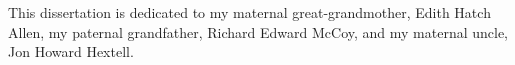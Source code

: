 This dissertation is dedicated to my maternal great-grandmother, Edith Hatch Allen, my paternal grandfather, Richard Edward McCoy, and my maternal uncle, Jon Howard Hextell. 